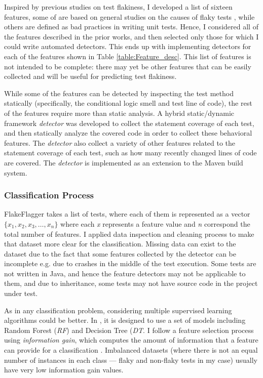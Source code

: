 Inspired by previous studies on test flakiness, I developed a list of sixteen features, 
some of are based on general studies on the causes of flaky tests \cite{luo2014empirical,ahmad2021empirical}, while others are defined as bad practices in writing unit tests.
Hence, I considered all of the features described in the prior works, and then selected only those for which I could write automated detectors.
This ends up with implementing detectors for each of the features shown in Table \ref{table:Feature_desc}. This list of features is not intended to be complete: there may yet be other features that can be easily collected and will be useful for predicting test flakiness.

While some of the features can be detected by inspecting the test method statically (specifically, the conditional logic smell and test line of code), the rest of the features require more than static analysis.
A hybrid static/dynamic framework \emph{detector} was developed to collect the statement coverage of each test, and then statically analyze the covered code in order to collect these behavioral features.
The \emph{detector} also collect a variety of other features related to the statement coverage of each test, such as how many recently changed lines of code are covered.
The \emph{detector} is implemented as an extension to the Maven build system.




\subsubsection{Classification Process}

FlakeFlagger takes a list of tests, where each of them is represented as a vector $\{x_1, x_2, x_3,\dots, x_n\}$  where each \emph{x} represents a feature value and \emph{n} correspond the total number of features. I applied data inspection and cleaning process to make that dataset more clear for the classification. Missing data can exist to the dataset due to the fact that some features collected by the detector can be incomplete e.g. due to crashes in the middle of the test execution. Some tests are not written in Java, and hence the feature detectors may not be applicable to them, and due to inheritance, some tests may not have source code in the project under test.

As in any classification problem, considering multiple supervised learning algorithms could be better. In \sysName, it is designed to use a set of models including Random Forest (\emph{RF}) and Decision Tree (\emph{DT}. I follow a feature selection process using \emph{information gain}, which computes the amount of information that a feature can provide for a classification \cite{lei2012feature}. Imbalanced datasets (where there is not an equal number of instances in each class --- flaky and non-flaky tests in my case) usually have very low information gain values. 


